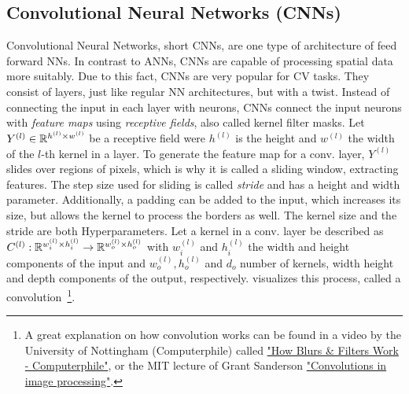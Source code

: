 \subsection{Convolutional Neural Networks (CNNs)}\label{subsec:cnn}
Convolutional Neural Networks, short CNNs, are one type of architecture of feed forward NNs.
In contrast to ANNs, CNNs are capable of processing spatial data more suitably.
Due to this fact, CNNs are very popular for CV tasks.
They consist of layers, just like regular NN architectures, but with a twist.
Instead of connecting the input in each layer with neurons, CNNs connect the input neurons with \textit{feature maps} using \textit{receptive fields}, also called kernel filter masks.
Let $Y^{(l)}\in \mathbb{R}^{h^{(l)}\times w^{(l)}}$ be a receptive field were $h^{(l)}$ is the height and $w^{(l)}$ the width of the $l$-th kernel in a layer.
To generate the feature map for a conv. layer, $Y^{(l)}$ slides over regions of pixels, which is why it is called a sliding window, extracting features.
The step size used for sliding is called \textit{stride} and has a height and width parameter.
Additionally, a padding can be added to the input, which increases its size, but allows the kernel to process the borders as well.
The kernel size and the stride are both Hyperparameters.
Let a kernel in a conv. layer be described as $C^{(l)}: \mathbb{R}^{w^{(l)}_i \times h^{(l)}_i} \rightarrow \mathbb{R}^{w^{(l)}_o \times h^{(l)}_o}$ with $w^{(l)}_i$ and $h^{(l)}_i$ the width and height components of the input and $w^{(l)}_o, h^{(l)}_o$ and $d_o$ number of kernels, width height and depth components of the output, respectively.
 visualizes this process, called a convolution~\footnote{A great explanation on how convolution works can be found in a video by the University of Nottingham (Computerphile) called \href{https://www.youtube.com/watch?v=C_zFhWdM4ic}{"How Blurs \& Filters Work - Computerphile"}, or the MIT lecture of Grant Sanderson \href{https://youtu.be/8rrHTtUzyZA}{"Convolutions in image processing"}.}.
